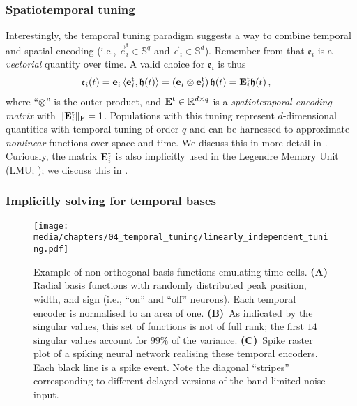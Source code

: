 \subsubsection{Spatiotemporal tuning}
Interestingly, the temporal tuning paradigm suggests a way to combine temporal and spatial encoding (i.e., $\vec{e}_i^\mathrm{t} \in \mathbb{S}^q$ and $\vec{e}_i \in \mathbb{S}^d$).
Remember from  that $\mathfrak{e}_i$ is a \emph{vectorial} quantity over time.
A valid choice for  $\mathfrak{e}_i$ is thus
\begin{align}
	\mathfrak{e}_i(t) &= \mathbf{e}_i \, \langle \mathbf{e}_i^\mathrm{t}, \mathbf{\mathfrak{h}}(t) \rangle = (\mathbf{e}_i \otimes \mathbf{e}_i^\mathrm{t}) \, \mathfrak{h}(t) = \mathbf{E}_i^\mathrm{t} \mathfrak{h}(t)\,,
	\label{eqn:spatio_temporal_encoding_vector}
\end{align}
where \enquote{$\otimes$} is the outer product, and $\mathbf{E}^\mathrm{t} \in \mathbb{R}^{d \times q}$ is a \emph{spatiotemporal encoding matrix} with $\| \mathbf{E}_i^\mathrm{t} \|_\mathrm{F} = 1$.
Populations with this tuning represent $d$-dimensional quantities with temporal tuning of order $q$ and can be harnessed to approximate \emph{nonlinear} functions over space and time.
We discuss this in more detail in .
Curiously, the matrix $\mathbf{E}_i^\mathrm{t}$ is also implicitly used in the Legendre Memory Unit (LMU; \cite{voelker2019lmu}); we discuss this in .

\subsubsection{Implicitly solving for temporal bases}

\begin{figure}
	\centering
	\texttt{[image: media/chapters/04\_temporal\_tuning/linearly\_independent\_tuning.pdf]}%
	{\label{fig:linearly_independent_tuning_a}}%
	{\label{fig:linearly_independent_tuning_b}}%
	{\label{fig:linearly_independent_tuning_c}}%
	\caption[Example of non-orthogonal basis functions emulating time cells]{Example of non-orthogonal basis functions emulating time cells.
	\textbf{(A)} Radial basis functions with randomly distributed peak position, width, and sign (i.e., \enquote{on} and \enquote{off} neurons).
	Each temporal encoder is normalised to an area of one.
\textbf{(B)}~As indicated by the singular values, this set of functions is not of full rank; the first $14$ singular values account for $99\%$ of the variance.
\textbf{(C)}~Spike raster plot of a spiking neural network realising these temporal encoders. Each black line is a spike event. Note the diagonal \enquote{stripes} corresponding to different delayed versions of the band-limited noise input.
}
	\label{fig:linearly_independent_tuning}
\end{figure}

